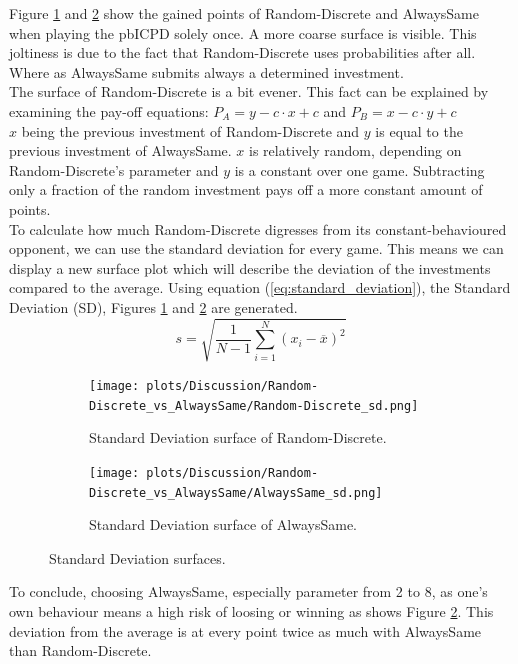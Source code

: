 \documentclass{article}
\begin{document}
	Figure \ref{fig:RNDD_one-iter} and \ref{fig:ALWS_one-iter} show the gained points of Random-Discrete and AlwaysSame when playing the pbICPD solely once.
	A more coarse surface is visible.
	This joltiness is due to the fact that Random-Discrete uses probabilities after all.
	Where as AlwaysSame submits always a determined investment.\\
	The surface of Random-Discrete is a bit evener. 
	This fact can be explained by examining the pay-off equations:
	$P_A = y - c \cdot x + c$ and $P_B = x - c \cdot y + c$\\
	$x$ being the previous investment of Random-Discrete and $y$ is equal to the previous investment of AlwaysSame.
	$x$ is relatively random, depending on Random-Discrete's parameter and $y$ is a constant over one game.
	Subtracting only a fraction of the random investment pays off a more constant amount of points.\\
	To calculate how much Random-Discrete digresses from its constant-behavioured opponent, we can use the standard deviation for every game.
	This means we can display a new surface plot which will describe the deviation of the investments compared to the average.
	Using equation (\ref{eq:standard_deviation}), the Standard Deviation (SD), Figures \ref{fig:RNDD_one-iter} and \ref{fig:ALWS_one-iter} are generated.
	\begin{equation}
		s = \sqrt{\frac{1}{N-1} \sum_{i=1}^N (x_i - \overline{x})^2}
		\label{eq:standard_deviation}
	\end{equation}
	\begin{figure}[h]
		\centering
		\begin{subfigure}[t]{0.45\textwidth}
			\centering
				\texttt{[image: plots/Discussion/Random-Discrete\_vs\_AlwaysSame/Random-Discrete\_sd.png]}
			\caption{Standard Deviation surface of Random-Discrete.}
			\label{fig:RNDD_one-iter}
		\end{subfigure}\hfill
		\begin{subfigure}[t]{0.45\textwidth}
			\centering
				\texttt{[image: plots/Discussion/Random-Discrete\_vs\_AlwaysSame/AlwaysSame\_sd.png]}
			\caption{Standard Deviation surface of AlwaysSame.}
			\label{fig:ALWS_one-iter}
		\end{subfigure}
		\caption{Standard Deviation surfaces.}
		\label{fig:two_one-iter}
	\end{figure}
	To conclude, choosing AlwaysSame, especially parameter from 2 to 8, as one's own behaviour means a high risk of loosing or winning as shows Figure \ref{fig:ALWS_one-iter}.
	This deviation from the average is at every point twice as much with AlwaysSame than Random-Discrete.
\end{document}
